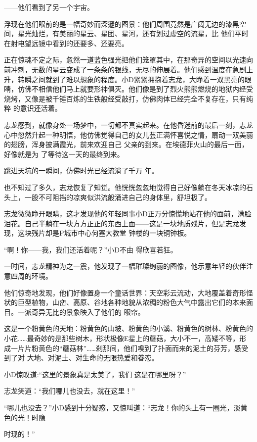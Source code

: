 \documentclass{article}
\begin{document}
——他们看到了另一个宇宙。 

浮现在他们眼前的是一幅奇妙而深邃的图景：他们周围竟然是广阔无边的漆黑空间，星光灿烂，有美丽的星云、星团、星河，还有划过虚空的流星，比
他们平时在射电望远镜中看到的还要多、还要亮。 

正在惊魂不定之际，忽然一道蓝色强光把他们笼罩其中，在那奇异的空间以光速向前冲刺，无数的星云变成了一条条的银线，无尽的伸展着。他们感到温度在急剧上升，转瞬之间就到了难以想象的程度。小D紧紧拥抱着志龙，大睁着一双黑亮的眼睛，仿佛不相信他们马上就要形神俱灭。他们像是到了烈火熊熊燃烧的地狱内经受烧烤，又像是被千锤百炼的生铁般经受敲打，仿佛肉体已经完全不复存在，只有纯粹
的意识还活着。 

志龙感到，就像身处一场梦中，一切都不真实起来。在他昏迷前的最后一刻，志龙心中忽然升起一种明悟，他仿佛觉得自己的女儿芸正满怀喜悦之情，扇动一双美丽的翅膀，浑身披满霞光，前来欢迎自己
\newpage
父亲的到来。在埃德菲火山的最后一面，好像就是为
了等待这一天的最终到来。 

跳进天坑的一瞬间，仿佛时光已经流淌了千万
年。 

也不知过了多久，志龙恢复了知觉。他恍恍忽忽地觉得自己好像躺在冬天冰凉的石头上，一股不可阻挡的凉爽似洪流般涌进自己的身体里，舒坦极了。

志龙微微睁开眼睛，这才发现他的年轻同事小D正万分惊慌地站在他的面前，满脸泪花。自己半躺在一块方方正正的东西上面——这是一块地质残片，但是志龙发现，这块残片却是P城市中心何塞大教堂
钟楼的一块铜钟板。 

“啊！你——我，我们还活着呢？”小D不由
得欣喜若狂。 

一时间，志龙精神为之一震，他发现了一幅璀璨绚丽的图像，他示意年轻的伙伴注意四周的环境。
\newpage


他们惊奇地发现，他们好像置身一个童话世界：天空彩云流动，大地覆盖着奇形怪状的巨型植物，山峦、高原、谷地各种地貌从浓稠的粉色大气中露出它们的本来面目。一派奇异无比的景象映入了他们的
眼帘。 

这是一个粉黄色的天地：粉黄色的山坡、粉黄色的小溪、粉黄色的树林、粉黄色的小花……最奇妙的是那些树木，形状极像E星上的蘑菇，大小不一，高矮不等，形成一片片粉黄色的“蘑菇林”……刹那间，他们嗅到了扑面而来的泥土的芬芳，感受到了对
大地、对泥土、对生命的无限热爱和眷恋。 

小D惊叹道:“这里的景象真是太美了，我们
这是在哪里呀？” 

志龙笑道：“我们哪儿也没去，就在这里！”

“哪儿也没去？”小D感到十分疑惑，又惊叫道：“志龙！你的头上有一圈光，淡黄色的光！时隐
\newpage

时现的！” 
\end{document}
